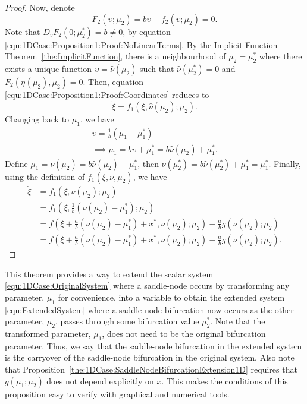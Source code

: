 \documentclass[12pt]{article}
\begin{document}
\begin{proof}
    Now, denote
    \begin{equation*}
        F_{2}(\upsilon;\mu_{2})=b\upsilon +f_{2}(\upsilon;\mu_{2})=0.
    \end{equation*}
    Note that $D_{v}F_{2}(0;\mu_{2}^{*})=b\neq 0$, by equation \eqref{equ:1DCase:Proposition1:Proof:NoLinearTerms}. By the Implicit Function Theorem~\ref{the:ImplicitFunction}, there is a neighbourhood of $\mu_{2}=\mu_{2}^{*}$ where there exists a unique function $\upsilon=\hat\nu(\mu_{2})$ such that $\hat\nu(\mu_{2}^{*})=0$ and $F_{2}(\eta_{}(\mu_{2}),\mu_{2})=0$. Then, equation \eqref{equ:1DCase:Proposition1:Proof:Coordinates} reduces to
    \begin{equation*}
        \dot \xi = f_{1}(\xi ,\hat\nu(\mu_{2});\mu_{2}).
    \end{equation*}
    Changing back to $\mu_{1}$, we have
    \begin{gather*}
        \upsilon = \tfrac{1}{b}(\mu_{1}-\mu_{1}^{*}) \\
        \implies \mu_{1}=b\upsilon+\mu_{1}^{*}=b\hat\nu(\mu_{2})+\mu_{1}^{*}.
    \end{gather*}
    Define $\mu_{1}=\nu(\mu_{2}) = b\hat\nu(\mu_{2})+\mu_{1}^{*}$, then $\nu(\mu_{2}^{*})=b\hat\nu(\mu_{2}^{*})+\mu_{1}^{*}=\mu_{1}^{*}$.
    Finally, using the definition of $f_{1}(\xi,\nu,\mu_{2})$, we have
    \begin{align*}
        \dot \xi & = f_{1}(\xi ,\nu(\mu_{2});\mu_{2}) \\
        & = f_{1}(\xi,\tfrac{1}{b}(\nu(\mu_{2})-\mu_{1}^{*});\mu_{2}) \\
        & = f(\xi+\tfrac{a}{b}(\nu(\mu_{2})-\mu_{1}^{*})+x^{*}, \nu(\mu_{2});\mu_{2})-\tfrac{a}{b}g(\nu(\mu_{2});\mu_{2}) \\
        & = f(\xi+\tfrac{a}{b}(\nu(\mu_{2})-\mu_{1}^{*})+x^{*}, \nu(\mu_{2});\mu_{2})-\tfrac{a}{b}g(\nu(\mu_{2});\mu_{2}).
    \end{align*}
\end{proof}

This theorem provides a way to extend the scalar system \eqref{equ:1DCase:OriginalSystem} where a saddle-node occurs by transforming any parameter, $\mu_{1}$ for convenience, into a variable to obtain the extended system \eqref{equ:ExtendedSystem} where a saddle-node bifurcation now occurs as the other parameter, $\mu_{2}$, passes through some bifurcation value $\mu_{2}^{*}$. Note that the transformed parameter, $\mu_{1}$, does not need to be the original bifurcation parameter. Thus, we say that the saddle-node bifurcation in the extended system is the carryover of the saddle-node bifurcation in the original system. Also note that Proposition~\ref{the:1DCase:SaddleNodeBifurcationExtension1D} requires that $g(\mu_{1};\mu_{2})$ does not depend explicitly on $x$. This makes the conditions of this proposition easy to verify with graphical and numerical tools.
\end{document}
